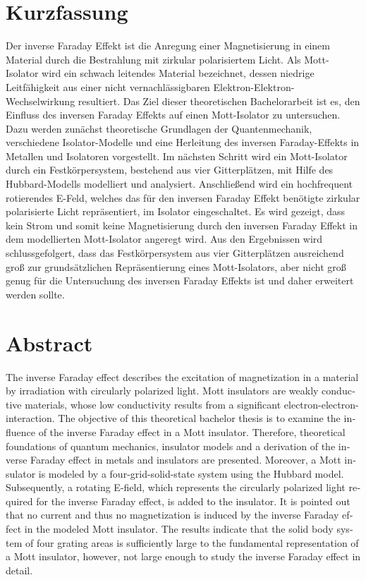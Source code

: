 \thispagestyle{plain}

\section*{Kurzfassung}

Der inverse Faraday Effekt ist die Anregung einer Magnetisierung in einem Material durch die Bestrahlung mit
zirkular polarisiertem Licht. Als Mott-Isolator wird ein schwach leitendes Material bezeichnet, dessen
niedrige Leitfähigkeit aus einer nicht vernachlässigbaren Elektron-Elektron-Wechselwirkung resultiert.
Das Ziel dieser theoretischen Bachelorarbeit ist es, den Einfluss des inversen Faraday Effekts auf einen Mott-Isolator zu untersuchen.
Dazu werden zunächst theoretische Grundlagen der Quantenmechanik, verschiedene
Isolator-Modelle und eine Herleitung des inversen Faraday-Effekts in Metallen und Isolatoren vorgestellt.
Im nächsten Schritt wird ein Mott-Isolator durch ein Festkörpersystem, bestehend aus vier Gitterplätzen,
mit Hilfe des Hubbard-Modells modelliert und analysiert. Anschließend wird ein hochfrequent rotierendes E-Feld,
welches das für den inversen Faraday Effekt benötigte zirkular polarisierte Licht repräsentiert, im Isolator eingeschaltet.
Es wird gezeigt, dass kein Strom und somit keine Magnetisierung durch den inversen Faraday Effekt in dem
modellierten Mott-Isolator angeregt wird. Aus den Ergebnissen wird schlussgefolgert,
dass das Festkörpersystem aus vier Gitterplätzen ausreichend groß zur grundsätzlichen
Repräsentierung eines Mott-Isolators, aber nicht groß genug für die Untersuchung des inversen Faraday Effekts ist
und daher erweitert werden sollte.

\section*{Abstract}

\begin{english}
The inverse Faraday effect describes the excitation of magnetization in a material by irradiation with
circularly polarized light. Mott insulators are weakly conductive materials, whose
low conductivity results from a significant electron-electron-interaction.
The objective of this theoretical bachelor thesis is to examine the influence of the
inverse Faraday effect in a Mott insulator.
Therefore, theoretical foundations of quantum mechanics,
insulator models and a derivation of the inverse Faraday effect in metals and insulators are presented.
Moreover, a Mott insulator is modeled by a four-grid-solid-state system using the Hubbard model.
Subsequently, a rotating E-field, which represents the circularly polarized light required for the inverse Faraday effect, is added to the insulator.
It is pointed out that no current and thus no magnetization is induced by the inverse Faraday effect in the
modeled Mott insulator. The results indicate that the solid body system of four grating areas is sufficiently large to the fundamental
representation of a Mott insulator, however, not large enough to study the inverse Faraday effect in detail.
\end{english}
